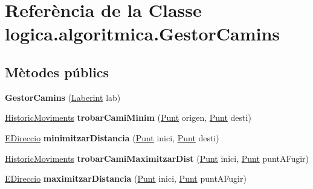 \hypertarget{classlogica_1_1algoritmica_1_1_gestor_camins}{\section{Referència de la Classe logica.\+algoritmica.\+Gestor\+Camins}
\label{classlogica_1_1algoritmica_1_1_gestor_camins}
}
\subsection*{Mètodes públics}
\begin{DoxyCompactItemize}
\item 
\hypertarget{classlogica_1_1algoritmica_1_1_gestor_camins_a042c8215a6d89097b5b8048a70872e35}{{\bfseries Gestor\+Camins} (\hyperlink{classlogica_1_1laberints_1_1_laberint}{Laberint} lab)}\label{classlogica_1_1algoritmica_1_1_gestor_camins_a042c8215a6d89097b5b8048a70872e35}

\item 
\hypertarget{classlogica_1_1algoritmica_1_1_gestor_camins_a5d7198aa32d0be2a72e15eda16f2ba3d}{\hyperlink{classlogica_1_1historic__moviments_1_1_historic_moviments}{Historic\+Moviments} {\bfseries trobar\+Cami\+Minim} (\hyperlink{classlogica_1_1_punt}{Punt} origen, \hyperlink{classlogica_1_1_punt}{Punt} desti)}\label{classlogica_1_1algoritmica_1_1_gestor_camins_a5d7198aa32d0be2a72e15eda16f2ba3d}

\item 
\hypertarget{classlogica_1_1algoritmica_1_1_gestor_camins_a0d693f225ae915f3024a13ce02ad40f6}{\hyperlink{enumlogica_1_1enumeracions_1_1_e_direccio}{E\+Direccio} {\bfseries minimitzar\+Distancia} (\hyperlink{classlogica_1_1_punt}{Punt} inici, \hyperlink{classlogica_1_1_punt}{Punt} desti)}\label{classlogica_1_1algoritmica_1_1_gestor_camins_a0d693f225ae915f3024a13ce02ad40f6}

\item 
\hypertarget{classlogica_1_1algoritmica_1_1_gestor_camins_abe60dac7f02241b56588f5518a4442ea}{\hyperlink{classlogica_1_1historic__moviments_1_1_historic_moviments}{Historic\+Moviments} {\bfseries trobar\+Cami\+Maximitzar\+Dist} (\hyperlink{classlogica_1_1_punt}{Punt} inici, \hyperlink{classlogica_1_1_punt}{Punt} punt\+A\+Fugir)}\label{classlogica_1_1algoritmica_1_1_gestor_camins_abe60dac7f02241b56588f5518a4442ea}

\item 
\hypertarget{classlogica_1_1algoritmica_1_1_gestor_camins_ae550937a10a38e8a03748c922d4a6931}{\hyperlink{enumlogica_1_1enumeracions_1_1_e_direccio}{E\+Direccio} {\bfseries maximitzar\+Distancia} (\hyperlink{classlogica_1_1_punt}{Punt} inici, \hyperlink{classlogica_1_1_punt}{Punt} punt\+A\+Fugir)}\label{classlogica_1_1algoritmica_1_1_gestor_camins_ae550937a10a38e8a03748c922d4a6931}

\end{DoxyCompactItemize}


